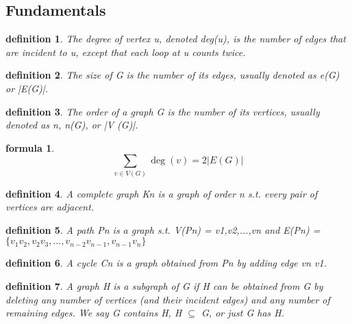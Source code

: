 \documentclass[twocolumn]{article}
\title{}
\newtheorem{definition}{definition}
\newtheorem{formula}{formula}
\begin{document}
\begin{CJK*}{UTF8}{bkai}


\section{Fundamentals}

    \begin{definition}
        The degree of vertex u, denoted deg(u), is the number of edges that are
 incident to u, except that each loop at u counts twice.
    \end{definition}

    \begin{definition}
    The size of G is the number of its edges, usually denoted as e(G) or |E(G)|.
    \end{definition}
    
    \begin{definition}
        The order of a graph G is the number of its vertices, usually denoted as n,
 n(G), or |V (G)|.
    \end{definition}
    
    \begin{formula}
    \[
    \sum_{v \in V(G)} \deg(v) = 2 |E(G)|
    \]
    \end{formula}

    \begin{definition}
        A complete graph Kn is a graph of order n s.t. every pair of vertices are
 adjacent.
    \end{definition}

    \begin{definition}
        A path Pn is a graph s.t. V(Pn) = {v1,v2,...,vn} and
 E(Pn) = $\{v_{1}v_{2},v_{2}v_{3},...,v_{n−2}v_{n−1},v_{n−1}v_{n}\}$
    \end{definition}

    \begin{definition}
        A cycle Cn is a graph obtained from Pn by adding edge vn v1.
    \end{definition}

    \begin{definition}
     A graph H is a subgraph of G if H can be obtained from G by deleting any
 number of vertices (and their incident edges) and any number of remaining
 edges. We say G contains H, H $\subseteq$ G, or just G has H.        
    \end{definition}
    

\end{CJK*}
\end{document}
